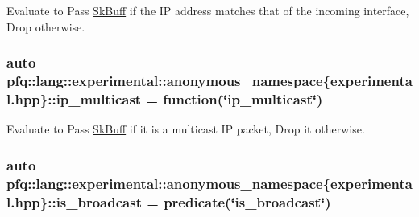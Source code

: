 Evaluate to {\ttfamily Pass} \hyperlink{structpfq_1_1lang_1_1SkBuff}{Sk\+Buff} if the IP address matches that of the incoming interface, {\ttfamily Drop} otherwise. 

\subsubsection[{\texorpdfstring{ip\+\_\+multicast}{ip_multicast}}]{\setlength{\rightskip}{0pt plus 5cm}auto pfq\+::lang\+::experimental\+::anonymous\+\_\+namespace\{experimental.\+hpp\}\+::ip\+\_\+multicast = {\bf function}(\char`\"{}ip\+\_\+multicast\char`\"{})}\hypertarget{namespacepfq_1_1lang_1_1experimental_1_1anonymous__namespace_02experimental_8hpp_03_ab9e6818d6b72bab5885dda6212a3ba52}{}\label{namespacepfq_1_1lang_1_1experimental_1_1anonymous__namespace_02experimental_8hpp_03_ab9e6818d6b72bab5885dda6212a3ba52}


Evaluate to {\ttfamily Pass} \hyperlink{structpfq_1_1lang_1_1SkBuff}{Sk\+Buff} if it is a multicast IP packet, {\ttfamily Drop} it otherwise. 

\subsubsection[{\texorpdfstring{is\+\_\+broadcast}{is_broadcast}}]{\setlength{\rightskip}{0pt plus 5cm}auto pfq\+::lang\+::experimental\+::anonymous\+\_\+namespace\{experimental.\+hpp\}\+::is\+\_\+broadcast = {\bf predicate}(\char`\"{}is\+\_\+broadcast\char`\"{})}\hypertarget{namespacepfq_1_1lang_1_1experimental_1_1anonymous__namespace_02experimental_8hpp_03_aa9e352437ab1621e226173bc1d900b96}{}\label{namespacepfq_1_1lang_1_1experimental_1_1anonymous__namespace_02experimental_8hpp_03_aa9e352437ab1621e226173bc1d900b96}


